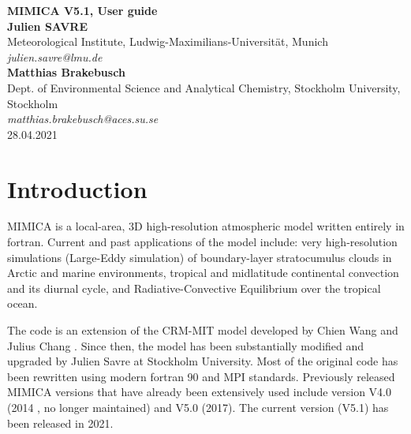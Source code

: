 \documentclass[12pt,A4,french]{article}
\begin{document}
\begin{titlepage}

\voffset=9cm

\begin{center}
{\bf\huge{MIMICA V5.1, User guide}}\\
\vspace{3 cm}
\large{{\bf Julien SAVRE}}\\
\large{Meteorological Institute, Ludwig-Maximilians-Universit\"at, Munich}\\
\large{{\it julien.savre@lmu.de}}\\
\vspace{0.25 cm}
\large{{\bf Matthias Brakebusch}}\\
\large{Dept. of Environmental Science and Analytical Chemistry, Stockholm University, Stockholm}\\
\large{{\it matthias.brakebusch@aces.su.se}}\\
\vspace{1 cm}
\large{28.04.2021}
\end{center}

\end{titlepage}

\tableofcontents

\newpage
\section{Introduction}

MIMICA is a local-area, 3D high-resolution atmospheric model written entirely in fortran. Current and past applications of the model include: very high-resolution simulations (Large-Eddy simulation) of boundary-layer stratocumulus clouds in Arctic and marine environments, tropical and midlatitude continental convection and its diurnal cycle, and Radiative-Convective Equilibrium over the tropical ocean.

The code is an extension of the CRM-MIT model developed by Chien Wang and Julius Chang \cite{WC1993}. Since then, the model has been substantially modified and upgraded by Julien Savre at Stockholm University. Most of the original code has been rewritten using modern fortran 90 and MPI standards.  Previously released MIMICA versions that have already been extensively used include version V4.0 (2014 \cite{MIMICA2014}, no longer maintained) and V5.0 (2017). The current version (V5.1) has been released in 2021. 
\end{document}
